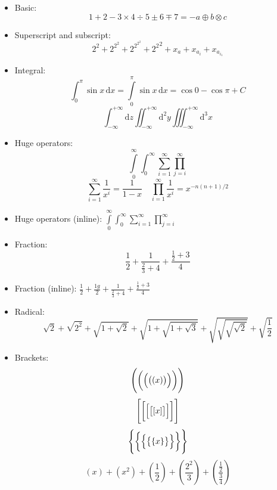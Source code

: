 \documentclass{article}
\begin{document}
\begin{itemize}
  \item Basic:
        \[ 1 + 2 - 3 \times 4 \div 5 \pm 6 \mp 7 = -a \oplus b \otimes c \]

  \item Superscript and subscript:
        \[ 2^2 + 2^{2^2} + 2^{2^{2^2}} + {2^2}^2 + x_a + x_{a_i} + x_{a_{i_1}} \]

  \item Integral:
        \[
            \int_0^\pi        \sin x \, \mathrm{d} x
          = \int\limits_0^\pi \sin x \, \mathrm{d} x
          = \cos 0 - \cos\pi + C
        \]
        \[
          \int_{-\infty}^{+\infty}   \mathrm{d} z
          \iint_{-\infty}^{+\infty}  \mathrm{d}^2 y
          \iiint_{-\infty}^{+\infty} \mathrm{d}^3 x
        \]

  \item Huge operators:
        \[ \int\limits_0^\infty \int_0^\infty \sum_{i=1}^\infty \prod_{j=i}^\infty \]
        \[
          \sum_{i=1}^{\infty}  \frac{1}{x^i} = \frac{1}{1-x} \quad
          \prod_{i=1}^{\infty} \frac{1}{x^i} = x^{-n(n+1)/2}
        \]

  \item Huge operators (inline):
        $ \int\limits_0^\infty \int_0^\infty \sum_{i=1}^\infty \prod_{j=i}^\infty $

  \item Fraction:
        \[ \frac{1}{2} + \frac{1}{\frac{2}{3}+4} + \frac{\frac{1}{2}+3}{4} \]

  \item Fraction (inline):
        $ \frac{1}{2} + \frac{1g}{2} + \frac{1}{\frac{2}{3}+4} + \frac{\frac{1}{2}+3}{4} $

  \item Radical:
        \[
            \sqrt{2} + \sqrt{2^2} + \sqrt{1+\sqrt{2}} + \sqrt{1+\sqrt{1+\sqrt{3}}}
          + \sqrt{\sqrt{\sqrt{\sqrt{2}}}} + \sqrt{\frac{1}{2}}
        \]

  \item Brackets:
        \[ \Biggl(  \biggl(  \Bigl(  \bigl(   (x)  \bigr)  \Bigr)  \biggr)  \Biggr)  \]
        \[ \Biggl[  \biggl[  \Bigl[  \bigl[   [x]  \bigr]  \Bigr]  \biggr]  \Biggr]  \]
        \[ \Biggl\{ \biggl\{ \Bigl\{ \bigl\{ \{x\} \bigr\} \Bigr\} \biggr\} \Biggr\} \]
        \[
            \left( x \right) + \left( x^2 \right)
          + \left( \frac{1}{2} \right) + \left( \frac{2^2}{3} \right)
          + \left( \frac{\frac{1}{2}}{\frac{3}{4}} \right)
        \]
\end{itemize}
\end{document}
